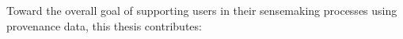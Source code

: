 %
%
%



Toward the overall goal of supporting users in their sensemaking processes using provenance data, this thesis contributes:

